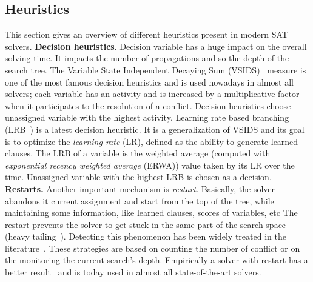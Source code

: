 \subsection{Heuristics}\label{sec:heuristics}
This section gives an overview of different heuristics present in modern SAT solvers.
\textbf{Decision heuristics}. Decision variable has a huge impact on the 
overall solving time. It impacts the number of propagations and so 
the depth of the search tree.
The Variable State Independent Decaying Sum (VSIDS)~\cite{moskewicz2001chaff} measure is one of the most famous decision heuristics and is used
nowadays in almost all solvers; each variable has an activity and  is increased by a multiplicative factor 
when it participates to the resolution of a conflict.
Decision heuristics choose unassigned variable with the highest activity.
Learning rate based branching (LRB~\cite{liang2016learning}) is a latest decision heuristic. It is a
generalization of VSIDS and its goal is to optimize the \emph{learning rate} (LR), defined as the ability to generate
learned clauses. The LRB of a variable is the weighted average (computed with \emph{exponential recency
weighted average} (ERWA))  value taken by its LR over the time. Unassigned variable with the highest LRB is chosen as a decision. 
\textbf{Restarts.}
Another important mechanism is \emph{restart}. Basically, the solver abandons it current assignment and 
start from the top of the tree, while maintaining some information, like learned clauses, scores of variables, etc The restart prevents the solver to get stuck in the same part of the search space (heavy tailing~\cite{gomes1997heavy}).
Detecting this phenomenon has been widely treated in the literature~\cite{audemard2012refining,biere2008adaptive}.
These strategies are based on counting the number of conflict or on the monitoring the current search's depth.
Empirically a solver with restart has a better result~\cite{huang2007effect} and is today
used in almost all state-of-the-art solvers.

